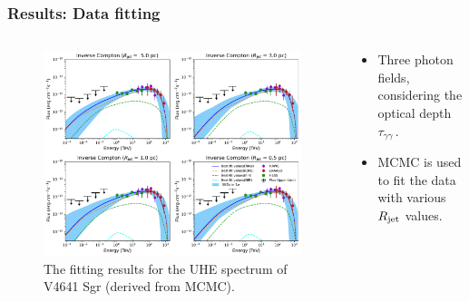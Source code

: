 \documentclass[10pt,aspectratio=169,mathserif]{beamer}
\begin{document}
\begin{frame}
  \frametitle{Results: Data fitting}
    \begin{columns}[T] %
    \begin{column}{0.5\textwidth} 
      \begin{figure}
        \includegraphics[width=\textwidth]{IC_all_HESS_q=1.6666666666666667.pdf}
        \caption{The fitting results for the UHE spectrum of V4641 Sgr (derived from MCMC).}
        \label{fig:confine}
      \end{figure}
    \end{column}
    \begin{column}{0.5\textwidth} %
      \begin{itemize}
          \item Three photon fields, considering the optical depth $\tau_{\gamma \gamma}\,.$
          \item MCMC is used to fit the data with various $R_{\rm jet}$ values.
      \end{itemize}

    \begin{table}
        \caption{Best-fit parameters from $\chi^2$ tests}
        \setlength{\belowcaptionskip}{0pt}
        \label{tab:paras1}
\end{table}
\end{column}
\end{columns}
\end{frame}
\end{document}
